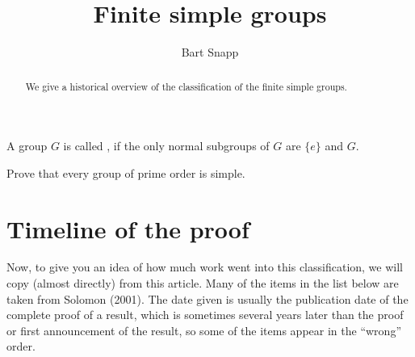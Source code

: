 \documentclass{ximera}
\author{Bart Snapp}
\title{Finite simple groups}
\begin{document}
\begin{abstract}
  We give a historical overview of the classification of the finite
  simple groups. 
\end{abstract}
\maketitle


\begin{definition}
  A group $G$ is called , if the only normal subgroups of
  $G$ are $\{e\}$ and $G$.
\end{definition}


\begin{exercise}
  Prove that every group of prime order is simple.
\end{exercise}


\section{Timeline of the proof}


Now, to give you an idea of how much work went into this
classification, we will copy (almost directly) from this
article. Many of the items in the list below are taken from Solomon
(2001). The date given is usually the publication date of the complete
proof of a result, which is sometimes several years later than the
proof or first announcement of the result, so some of the items appear
in the ``wrong'' order.
\end{document}
